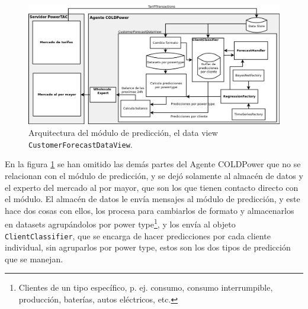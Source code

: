 \begin{figure}[h]
	\centering
	\includegraphics[width=16cm]{img/ArquitecturaModuloPrediccion.png}
	\caption{Arquitectura del módulo de predicción, el data view \texttt{CustomerForecastDataView}.}
	\label{fig:ArquitecturaModuloPrediccion}
\end{figure}

En la figura \ref{fig:ArquitecturaModuloPrediccion} se han omitido las demás partes del Agente COLDPower que no se relacionan con el módulo de predicción, y se dejó solamente al almacén de datos y el experto del mercado al por mayor, que son los que tienen contacto directo con el módulo. El almacén de datos le envía mensajes al módulo de predicción, y este hace dos cosas con ellos, los procesa para cambiarlos de formato y almacenarlos en datasets agrupándolos por power type\footnote{Clientes de un tipo específico, p. ej. consumo, consumo interrumpible, producción, baterías, autos eléctricos, etc.}, y los envía al objeto \texttt{ClientClassifier}, que se encarga de hacer predicciones por cada cliente individual, sin agruparlos por power type, estos son los dos tipos de predicción que se manejan. 

